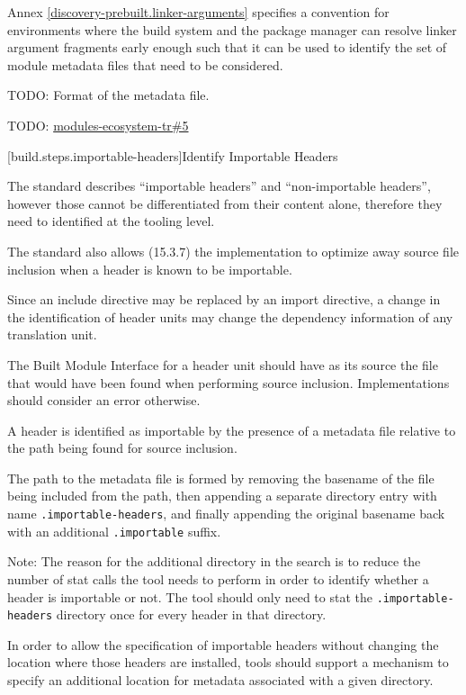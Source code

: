 \pnum Annex \ref{discovery-prebuilt.linker-arguments} specifies a
convention for environments where the build system and the package
manager can resolve linker argument fragments early enough such that
it can be used to identify the set of module metadata files that need
to be considered.

\pnum TODO: Format of the metadata file.

\pnum TODO: \href{https://github.com/cplusplus/modules-ecosystem-tr/issues/5}{modules-ecosystem-tr\#5}

[build.steps.importable-headers]{Identify Importable Headers}

\pnum The \Cpp{} standard describes ``importable headers'' and
``non-importable headers'', however those cannot be differentiated
from their content alone, therefore they need to identified at the
tooling level.

\pnum The \Cpp{} standard also allows (15.3.7) the implementation to
optimize away source file inclusion when a header is known to be
importable.

\pnum Since an include directive may be replaced by an import
directive, a change in the identification of header units may change
the dependency information of any translation unit.

\pnum The Built Module Interface for a header unit should have as its
source the file that would have been found when performing source
inclusion. Implementations should consider an error otherwise.

\pnum A header is identified as importable by the presence of a
metadata file relative to the path being found for source inclusion.

\pnum The path to the metadata file is formed by removing the basename
of the file being included from the path, then appending a separate
directory entry with name \texttt{.importable-headers}, and finally
appending the original basename back with an additional
\texttt{.importable} suffix.

\pnum Note: The reason for the additional directory in the search is
to reduce the number of stat calls the tool needs to perform in order
to identify whether a header is importable or not. The tool should
only need to stat the \texttt{.importable-headers} directory once for
every header in that directory.

\pnum In order to allow the specification of importable headers
without changing the location where those headers are installed, tools
should support a mechanism to specify an additional location for
metadata associated with a given directory.

